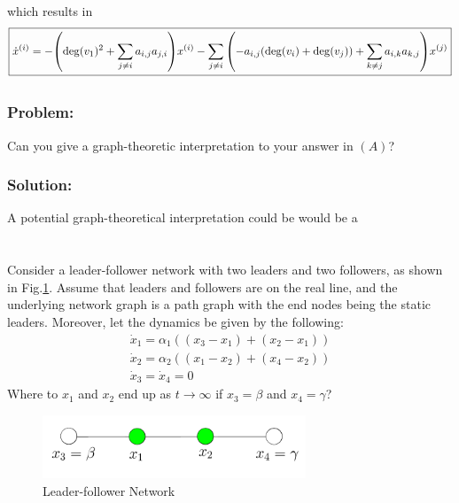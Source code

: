 \documentclass[]{article}
\numberwithin{equation}{section}
\renewcommand{\figurename}{Fig.}
\begin{document}
which results in \[\boxed{
    \dot{x}^{(i)} = - \qty(\deg(v_1)^2 + \sum_{j \neq i} a_{i,j} a_{j,i}) x^{(i)} 
                    - \sum_{j \neq i} \qty(-a_{i,j} (\deg(v_i) + \deg(v_j)) + \sum_{k \neq j} a_{i,k} a_{k,j}) x^{(j)}
}\]

\subsection{}
\subsubsection*{Problem:}
Can you give a graph-theoretic interpretation to your answer in $(A)$?

\subsubsection*{Solution:}
A potential graph-theoretical interpretation could be would be a 










\newpage
\section{}
Consider a leader-follower network with two leaders and two followers, as shown in \figurename \ref{fig:pblm3}. 
Assume that leaders and followers are on the real line, and the underlying network graph is a path graph with the end nodes being the static leaders.
Moreover, let the dynamics be given by the following:
\begin{gather*}
    \dot{x}_1 = \alpha_1((x_3-x_1) + (x_2 - x_1))\\
    \dot{x}_2 = \alpha_2((x_1-x_2) + (x_4 - x_2))\\
    \dot{x}_3 = \dot{x}_4 = 0
\end{gather*}
Where to $x_1$ and $x_2$ end up as $t \to \infty$ if $x_3 = \beta$ and $x_4 = \gamma$?

\begin{figure}[h]
    \centering
    \includegraphics[width=0.7\textwidth]{figs/pblm3.png}
    \caption{Leader-follower Network}
    \label{fig:pblm3}
\end{figure}
\end{document}
